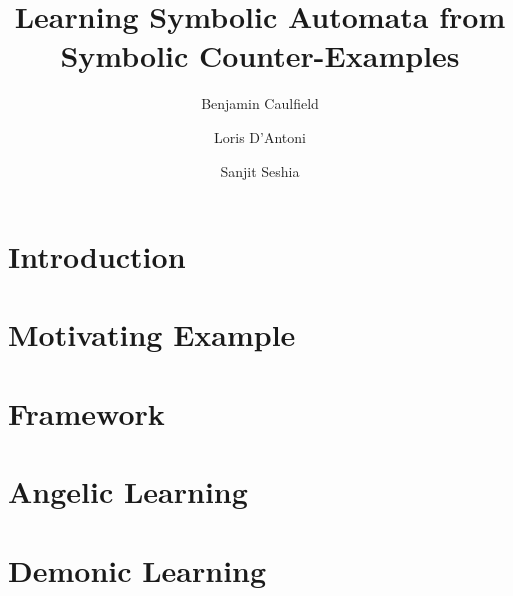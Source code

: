\documentclass[11pt]{amsart}
\title{Learning Symbolic Automata from Symbolic Counter-Examples}
\author{Benjamin Caulfield}
\author{Loris D'Antoni}
\author{Sanjit Seshia}
\date{}                                           %
\begin{document}
\maketitle

\section{Introduction}

\section{Motivating Example}


\section{Framework}




\section{Angelic Learning}






\section{Demonic Learning}
\end{document}
